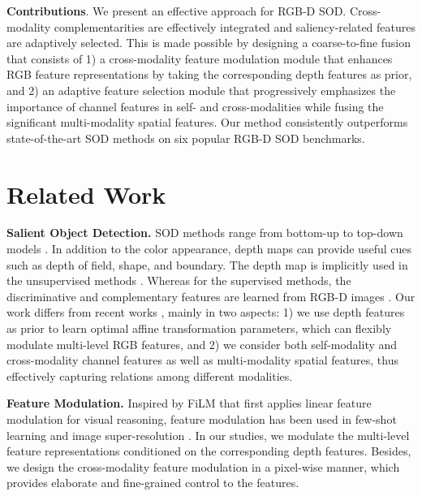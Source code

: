 \documentclass[runningheads]{llncs}
\begin{document}
\noindent\textbf{Contributions}. We present an effective approach for RGB-D SOD. Cross-modality complementarities are effectively integrated and saliency-related features are adaptively selected. This is made possible by designing a coarse-to-fine fusion that consists of 1) a cross-modality feature modulation module that enhances RGB feature representations by taking the corresponding depth features as prior, and 2) an adaptive feature selection module that progressively emphasizes the importance of channel features in self- and cross-modalities while fusing the significant multi-modality spatial features.
Our method consistently outperforms state-of-the-art SOD methods on six popular RGB-D SOD benchmarks.



\section{Related Work}


\noindent
\textbf{Salient Object Detection.} SOD methods range from bottom-up \cite{DSR,SMD,RCRR} to top-down models \cite{AFNet,Guan2018,DSS,PoolNet,BASNet,EGNet}.
In addition to the color appearance, depth maps can provide useful cues such as depth of field, shape, and boundary.
The depth map is implicitly used in the unsupervised methods \cite{crm2019tc,DCMC,ACSD,Niu2012,Peng2014,Song2017,Zhu2018}. Whereas for the supervised methods, the discriminative and complementary features are learned from RGB-D images \cite{PCFN,TAN,DCFF,MMCI,fan2020bbs,Fu2020JLDCF,CTMF,ASIF-Net,DMRA,DF,Zhang2020CVPR,Zhangmiao2020CVPR,CPFP}.
Our work differs from recent works \cite{fan2020bbs,Fu2020JLDCF,DMRA,A2dele,Zhang2020CVPR,Zhangmiao2020CVPR,CPFP}, mainly in two aspects: 1) we use depth features as prior to learn optimal affine transformation parameters, which can flexibly modulate multi-level RGB features, and 2) we consider both self-modality and cross-modality channel features as well as multi-modality spatial features, thus effectively capturing relations among different modalities.


\noindent
\textbf{Feature Modulation.}
Inspired by FiLM \cite{FiLM} that first applies linear feature modulation for visual reasoning, feature modulation has been used in few-shot learning \cite{TADAM} and image super-resolution \cite{SR2018}.
In our studies, we modulate the multi-level feature representations conditioned on the corresponding depth features. Besides, we design the cross-modality feature modulation in a pixel-wise manner, which provides elaborate and fine-grained control to the features.
\end{document}

